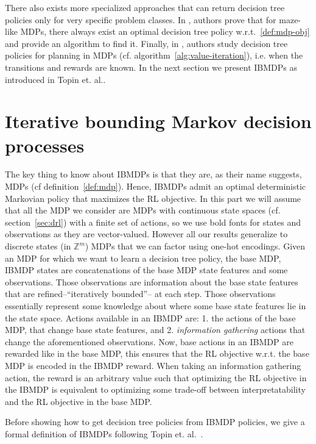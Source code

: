 There also exists more specialized approaches that can return decision tree policies only for very specific problem classes.
In \cite{dt-maze}, authors prove that for maze-like MDPs, there always exist an optimal decision tree policy w.r.t.~\ref{def:mdp-obj} and provide an algorithm to find it. 
Finally, in \cite{dt-opt-mdp}, authors study decision tree policies for planning in MDPs (cf. algorithm~\ref{alg:value-iteration}), i.e. when the transitions and rewards are known.
In the next section we present IBMDPs as introduced in Topin et. al.\cite{topin2021iterative}.

\section{Iterative bounding Markov decision processes}\label{sec:ibmdp}

The key thing to know about IBMDPs is that they are, as their name suggests, MDPs (cf definition~\ref{def:mdp}).
Hence, IBMDPs admit an optimal deterministic Markovian policy that maximizes the RL objective.
In this part we will assume that all the MDP we consider are MDPs with continuous state spaces (cf. section~\ref{sec:drl}) with a finite set of actions, so we use bold fonts for states and observations as they are vector-valued.
However all our results generalize to discrete states (in $\mathbb{Z}^m$) MDPs that we can factor using one-hot encodings. 
Given an MDP for which we want to learn a decision tree policy, the base MDP, IBMDP states are concatenations of the base MDP state features and some observations. 
Those observations are information about the base state features that are refined--``iteratively bounded''-- at each step.
Those observations essentially represent some knowledge about where some base state features lie in the state space.
Actions available in an IBMDP are: 1. the actions of the base MDP, that change base state features, and 2. \textit{information gathering} actions that change the aforementioned observations.
Now, base actions in an IBMDP are rewarded like in the base MDP, this ensures that the RL objective w.r.t. the base MDP is encoded in the IBMDP reward.
When taking an information gathering action, the reward is an arbitrary value such that optimizing the RL objective in the IBMDP is equivalent to optimizing some trade-off between interpretatability and the RL objective in the base MDP.
 
Before showing how to get decision tree policies from IBMDP policies, we give a formal definition of IBMDPs following Topin et. al.~\cite{topin2021iterative}.

